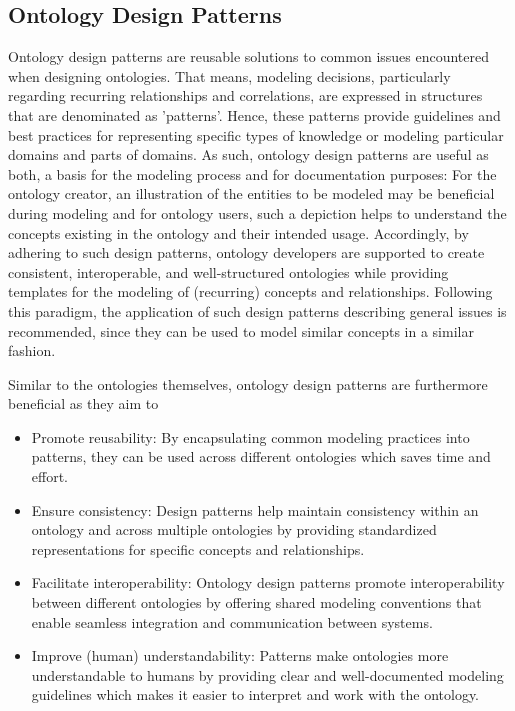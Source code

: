 
\subsection{Ontology Design Patterns}

Ontology design patterns are reusable solutions to common issues encountered when designing ontologies. That means, modeling decisions, particularly regarding recurring relationships and correlations, are expressed in structures that are denominated as 'patterns'. Hence, these patterns provide guidelines and best practices for representing specific types of knowledge or modeling particular domains and parts of domains. As such, ontology design patterns are useful as both, a basis for the modeling process and for documentation purposes: For the ontology creator, an illustration of the entities to be modeled may be beneficial during modeling and for ontology users, such a depiction helps to understand the concepts existing in the ontology and their intended usage. 
Accordingly, by adhering to such design patterns, ontology developers are supported to create consistent, interoperable, and well-structured ontologies while providing templates for the modeling of (recurring) concepts and relationships.
Following this paradigm, the application of such design patterns describing general issues is recommended, since they can be used to model similar concepts in a similar fashion. 

Similar to the ontologies themselves, ontology design patterns are furthermore beneficial as they aim to
\begin{itemize}
    \item Promote reusability: By encapsulating common modeling practices into patterns, they can be used across different ontologies which saves time and effort.
    \item Ensure consistency: Design patterns help maintain consistency within an ontology and across multiple ontologies by providing standardized representations for specific concepts and relationships.
    \item Facilitate interoperability: Ontology design patterns promote interoperability between different ontologies by offering shared modeling conventions that enable seamless integration and communication between systems.
    \item Improve (human) understandability: Patterns make ontologies more understandable to humans by providing clear and well-documented modeling guidelines which makes it easier to interpret and work with the ontology.
\end{itemize}

